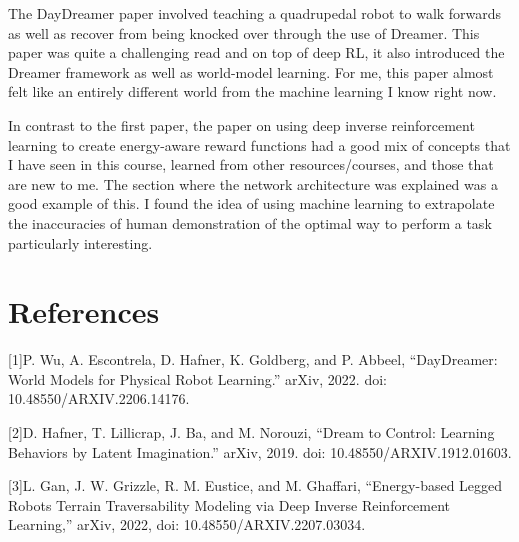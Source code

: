 \documentclass{article}
\begin{document}
The DayDreamer paper involved teaching a quadrupedal robot to walk forwards as well as recover from being knocked over through the use of Dreamer. This paper was quite a challenging read and on top of deep RL, it also introduced the Dreamer framework as well as world-model learning. For me, this paper almost felt like an entirely different world from the machine learning I know right now. 

In contrast to the first paper, the paper on using deep inverse reinforcement learning to create energy-aware reward functions had a good mix of concepts that I have seen in this course, learned from other resources/courses, and those that are new to me. The section where the network architecture was explained was a good example of this. I found the idea of using machine learning to extrapolate the inaccuracies of human demonstration of the optimal way to perform a task particularly interesting.



\label{headings}

\section*{References}

{
\small

[1]P. Wu, A. Escontrela, D. Hafner, K. Goldberg, and P. Abbeel, “DayDreamer: World Models for Physical Robot Learning.” arXiv, 2022. doi: 10.48550/ARXIV.2206.14176.

[2]D. Hafner, T. Lillicrap, J. Ba, and M. Norouzi, “Dream to Control: Learning Behaviors by Latent Imagination.” arXiv, 2019. doi: 10.48550/ARXIV.1912.01603.

[3]L. Gan, J. W. Grizzle, R. M. Eustice, and M. Ghaffari, “Energy-based Legged Robots Terrain Traversability Modeling via Deep Inverse Reinforcement Learning,” arXiv, 2022, doi: 10.48550/ARXIV.2207.03034.


}
\end{document}

